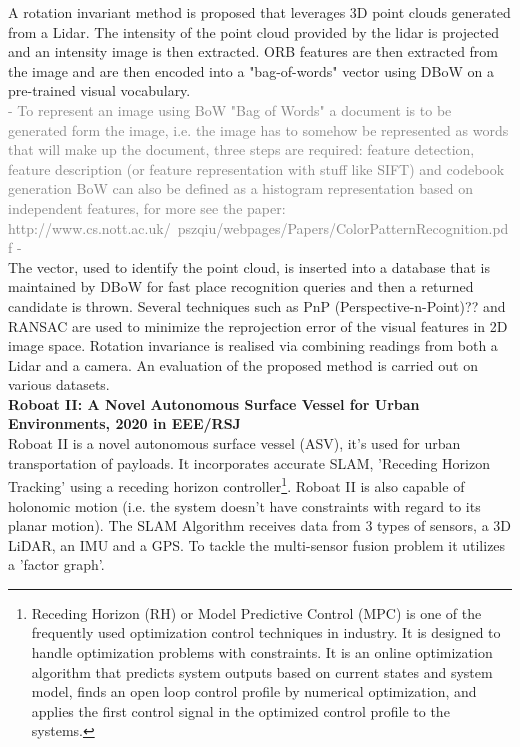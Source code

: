 \documentclass{article}
\begin{document}
A rotation invariant method is proposed that leverages 3D point clouds generated from a Lidar. The intensity of the point cloud provided by the lidar is projected and an intensity image is then extracted. ORB features are then extracted from the image and are then encoded into a "bag-of-words" vector using DBoW on a pre-trained visual vocabulary. 
\\
\textcolor{gray}{- To represent an image using BoW "Bag of Words" a document is to be generated form the image, i.e. the image has to somehow be represented as words that will make up the document, three steps are required: feature detection, feature description (or feature representation with stuff like SIFT) and codebook generation BoW can also be defined as a histogram representation based on independent features, for more see the paper:
\\ http://www.cs.nott.ac.uk/~pszqiu/webpages/Papers/ColorPatternRecognition.pdf -}
\\
The vector, used to identify the point cloud, is inserted into a database that is maintained by DBoW for fast place recognition queries and then a returned candidate is thrown. Several techniques such as PnP (Perspective-n-Point)?? and RANSAC are used to minimize the reprojection error of the visual features in 2D image space. Rotation invariance is realised via combining readings from both a Lidar and a camera. An evaluation of the proposed method is carried out on various datasets. 
\\
\textbf{Roboat II: A Novel Autonomous Surface Vessel for Urban Environments, 2020 in EEE/RSJ}
\vspace{3pt}
\\

Roboat II is a novel autonomous surface vessel (ASV), it's used for urban transportation of payloads. It incorporates accurate SLAM, 'Receding Horizon Tracking' using a receding horizon controller\footnote{Receding Horizon (RH) or Model Predictive Control (MPC) is one of the frequently used optimization control techniques in industry. It is designed to handle optimization problems with constraints. It is an online optimization algorithm that predicts system outputs based on current states and system model, finds an open loop control profile by numerical optimization, and applies the first control signal in the optimized control profile to the systems.}. Roboat II is also capable of holonomic motion (i.e. the system doesn't have constraints with regard to its planar motion). 
The SLAM Algorithm receives data from 3 types of sensors, a 3D LiDAR, an IMU and a GPS. To tackle the multi-sensor fusion problem it utilizes a 'factor graph'.
\end{document}
